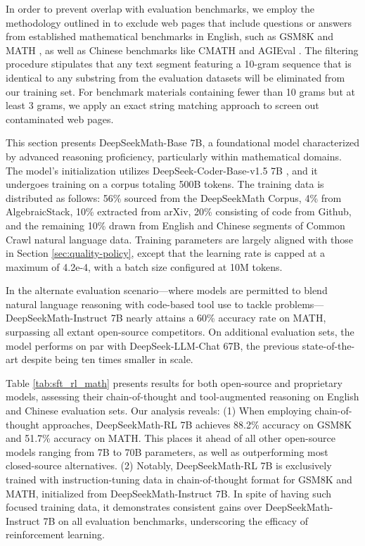 In order to prevent overlap with evaluation benchmarks, we employ the methodology outlined in \cite{deepseek-coder} to exclude web pages that include questions or answers from established mathematical benchmarks in English, such as GSM8K \citep{gsm8k} and MATH \citep{MATH}, as well as Chinese benchmarks like CMATH \citep{wei2023cmath} and AGIEval \citep{agieval}. The filtering procedure stipulates that any text segment featuring a 10-gram sequence that is identical to any substring from the evaluation datasets will be eliminated from our training set. For benchmark materials containing fewer than 10 grams but at least 3 grams, we apply an exact string matching approach to screen out contaminated web pages.

This section presents DeepSeekMath-Base 7B, a foundational model characterized by advanced reasoning proficiency, particularly within mathematical domains. The model's initialization utilizes DeepSeek-Coder-Base-v1.5 7B \citep{deepseek-coder}, and it undergoes training on a corpus totaling 500B tokens. The training data is distributed as follows: 56\% sourced from the DeepSeekMath Corpus, 4\% from AlgebraicStack, 10\% extracted from arXiv, 20\% consisting of code from Github, and the remaining 10\% drawn from English and Chinese segments of Common Crawl natural language data. Training parameters are largely aligned with those in Section \ref{sec:quality-policy}, except that the learning rate is capped at a maximum of 4.2e-4, with a batch size configured at 10M tokens.

In the alternate evaluation scenario—where models are permitted to blend natural language reasoning with code-based tool use to tackle problems—DeepSeekMath-Instruct 7B nearly attains a 60\% accuracy rate on MATH, surpassing all extant open-source competitors. On additional evaluation sets, the model performs on par with DeepSeek-LLM-Chat 67B, the previous state-of-the-art despite being ten times smaller in scale.

Table \ref{tab:sft_rl_math} presents results for both open-source and proprietary models, assessing their chain-of-thought and tool-augmented reasoning on English and Chinese evaluation sets. Our analysis reveals: (1) When employing chain-of-thought approaches, DeepSeekMath-RL 7B achieves 88.2\% accuracy on GSM8K and 51.7\% accuracy on MATH. This places it ahead of all other open-source models ranging from 7B to 70B parameters, as well as outperforming most closed-source alternatives. (2) Notably, DeepSeekMath-RL 7B is exclusively trained with instruction-tuning data in chain-of-thought format for GSM8K and MATH, initialized from DeepSeekMath-Instruct 7B. In spite of having such focused training data, it demonstrates consistent gains over DeepSeekMath-Instruct 7B on all evaluation benchmarks, underscoring the efficacy of reinforcement learning.


